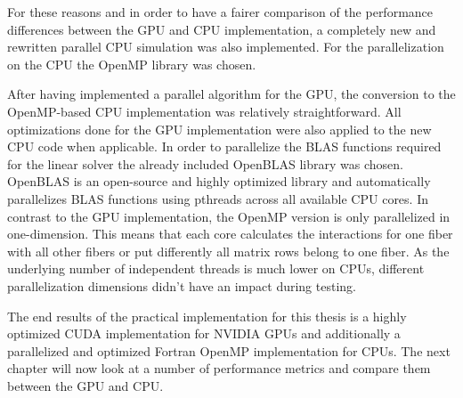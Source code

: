 For these reasons and in order to have a fairer comparison of the performance differences between the GPU and CPU implementation, a completely new and rewritten parallel CPU simulation was also implemented. For the parallelization on the CPU the OpenMP library was chosen.

After having implemented a parallel algorithm for the GPU, the conversion to the OpenMP-based CPU implementation was relatively straightforward. All optimizations done for the GPU implementation were also applied to the new CPU code when applicable. In order to parallelize the BLAS functions required for the linear solver the already included OpenBLAS library was chosen. OpenBLAS is an open-source and highly optimized library and automatically parallelizes BLAS functions using pthreads across all available CPU cores. In contrast to the GPU implementation, the OpenMP version is only parallelized in one-dimension. This means that each core calculates the interactions for one fiber with all other fibers or put differently all matrix rows belong to one fiber. As the underlying number of independent threads is much lower on CPUs, different parallelization dimensions didn't have an impact during testing.

The end results of the practical implementation for this thesis is a highly optimized CUDA implementation for NVIDIA GPUs and additionally a parallelized and optimized Fortran OpenMP implementation for CPUs. The next chapter will now look at a number of performance metrics and compare them between the GPU and CPU.
